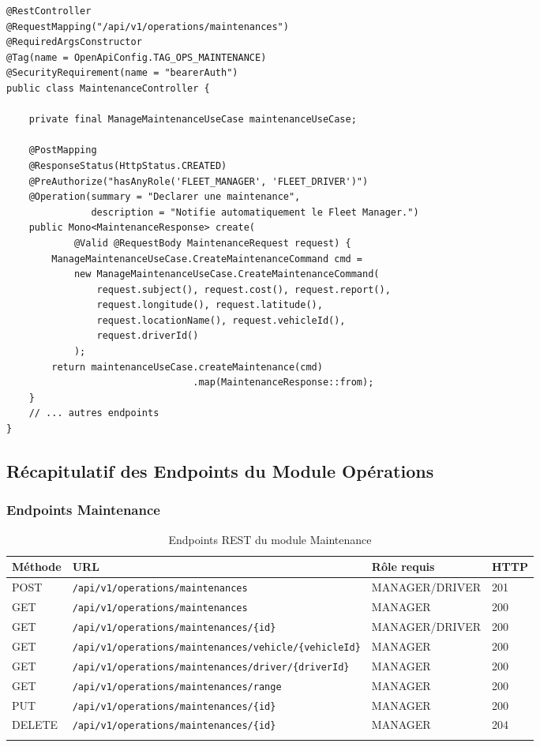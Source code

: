 \documentclass[12pt,a4paper]{report}
\begin{document}
\begin{lstlisting}[style=javaStyle, caption={Controller WebFlux MaintenanceController}]
@RestController
@RequestMapping("/api/v1/operations/maintenances")
@RequiredArgsConstructor
@Tag(name = OpenApiConfig.TAG_OPS_MAINTENANCE)
@SecurityRequirement(name = "bearerAuth")
public class MaintenanceController {

    private final ManageMaintenanceUseCase maintenanceUseCase;

    @PostMapping
    @ResponseStatus(HttpStatus.CREATED)
    @PreAuthorize("hasAnyRole('FLEET_MANAGER', 'FLEET_DRIVER')")
    @Operation(summary = "Declarer une maintenance",
               description = "Notifie automatiquement le Fleet Manager.")
    public Mono<MaintenanceResponse> create(
            @Valid @RequestBody MaintenanceRequest request) {
        ManageMaintenanceUseCase.CreateMaintenanceCommand cmd =
            new ManageMaintenanceUseCase.CreateMaintenanceCommand(
                request.subject(), request.cost(), request.report(),
                request.longitude(), request.latitude(),
                request.locationName(), request.vehicleId(),
                request.driverId()
            );
        return maintenanceUseCase.createMaintenance(cmd)
                                 .map(MaintenanceResponse::from);
    }
    // ... autres endpoints
}
\end{lstlisting}

\subsection{Récapitulatif des Endpoints du Module Opérations}

\subsubsection{Endpoints Maintenance}

\begin{longtable}{p{1.5cm}p{6.5cm}p{2.5cm}p{2cm}}
\toprule
\textbf{Méthode} & \textbf{URL} & \textbf{Rôle requis} & \textbf{HTTP} \\
\midrule
\endhead
POST & \texttt{/api/v1/operations/maintenances} & MANAGER/DRIVER & 201 \\
GET & \texttt{/api/v1/operations/maintenances} & MANAGER & 200 \\
GET & \texttt{/api/v1/operations/maintenances/\{id\}} & MANAGER/DRIVER & 200 \\
GET & \texttt{/api/v1/operations/maintenances/vehicle/\{vehicleId\}} & MANAGER & 200 \\
GET & \texttt{/api/v1/operations/maintenances/driver/\{driverId\}} & MANAGER & 200 \\
GET & \texttt{/api/v1/operations/maintenances/range} & MANAGER & 200 \\
PUT & \texttt{/api/v1/operations/maintenances/\{id\}} & MANAGER & 200 \\
DELETE & \texttt{/api/v1/operations/maintenances/\{id\}} & MANAGER & 204 \\
\bottomrule
\caption{Endpoints REST du module Maintenance}
\end{longtable}
\end{document}
